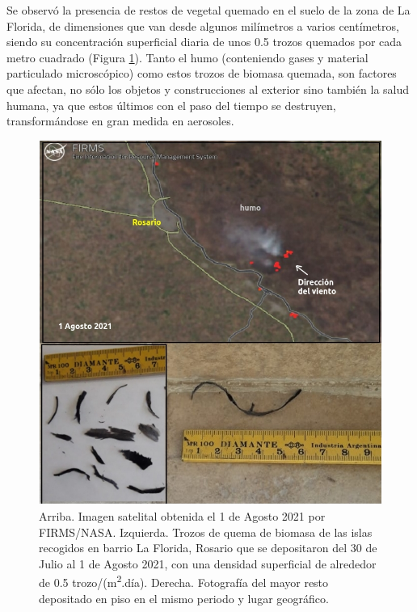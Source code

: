 Se observó la presencia de restos de vegetal quemado en el suelo de la zona de La Florida, de dimensiones que van desde algunos milímetros a varios centímetros, siendo su concentración superficial diaria de unos 0.5 trozos quemados por cada metro cuadrado (Figura \ref{fig:quema_de_biomasa}). Tanto el humo (conteniendo gases y material particulado microscópico) como estos trozos de biomasa quemada, son factores que afectan, no sólo los objetos y construcciones al exterior sino también la salud humana, ya que estos últimos con el paso del tiempo se destruyen, transformándose en gran medida en aerosoles.\\

\begin{figure}[H]
    \centering
    \includegraphics[width=0.6\paperwidth]{images/image2.jpg}
    \caption{Arriba. Imagen satelital obtenida el 1 de Agosto 2021 por FIRMS/NASA. Izquierda. Trozos de quema de biomasa de las islas recogidos en barrio La Florida, Rosario que se depositaron del 30 de Julio al 1 de Agosto 2021, con una densidad superficial de alrededor de 0.5 trozo/(m\textsuperscript{2}.día). Derecha. Fotografía del mayor resto  depositado en piso en el mismo periodo y lugar geográfico.}
    \label{fig:quema_de_biomasa}
\end{figure}

